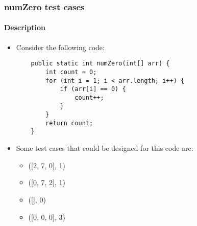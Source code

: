 \begin{frame}[hasprev=false,hasnext=false, fragile]
\label{example:num-zero-test-cases}
\frametitle{numZero test cases}
\framesubtitle{Description}

\begin{itemize}
	\item Consider the following code:
	\begin{lstlisting}
    public static int numZero(int[] arr) {
        int count = 0;
        for (int i = 1; i < arr.length; i++) {
            if (arr[i] == 0) {
                count++;
            }
        }
        return count;
    }
    \end{lstlisting}

	\item Some test cases that could be designed for this code are:
	\begin{itemize}
		\item ([2, 7, 0], 1)
		\item ([0, 7, 2], 1)
		\item ([], 0)
		\item ([0, 0, 0], 3)
	\end{itemize}
\end{itemize}

\end{frame}

